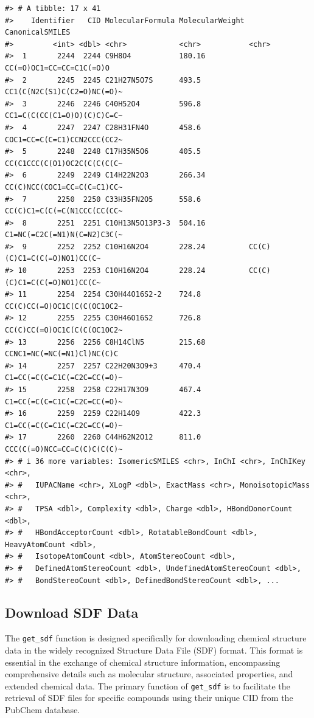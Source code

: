 \begin{verbatim}
#> # A tibble: 17 x 41
#>    Identifier   CID MolecularFormula MolecularWeight CanonicalSMILES            
#>         <int> <dbl> <chr>            <chr>           <chr>                      
#>  1       2244  2244 C9H8O4           180.16          CC(=O)OC1=CC=CC=C1C(=O)O   
#>  2       2245  2245 C21H27N5O7S      493.5           CC1(C(N2C(S1)C(C2=O)NC(=O)~
#>  3       2246  2246 C40H52O4         596.8           CC1=C(C(CC(C1=O)O)(C)C)C=C~
#>  4       2247  2247 C28H31FN4O       458.6           COC1=CC=C(C=C1)CCN2CCC(CC2~
#>  5       2248  2248 C17H35N5O6       405.5           CC(C1CCC(C(O1)OC2C(C(C(C(C~
#>  6       2249  2249 C14H22N2O3       266.34          CC(C)NCC(COC1=CC=C(C=C1)CC~
#>  7       2250  2250 C33H35FN2O5      558.6           CC(C)C1=C(C(=C(N1CCC(CC(CC~
#>  8       2251  2251 C10H13N5O13P3-3  504.16          C1=NC(=C2C(=N1)N(C=N2)C3C(~
#>  9       2252  2252 C10H16N2O4       228.24          CC(C)(C)C1=C(C(=O)NO1)CC(C~
#> 10       2253  2253 C10H16N2O4       228.24          CC(C)(C)C1=C(C(=O)NO1)CC(C~
#> 11       2254  2254 C30H44O16S2-2    724.8           CC(C)CC(=O)OC1C(C(C(OC1OC2~
#> 12       2255  2255 C30H46O16S2      726.8           CC(C)CC(=O)OC1C(C(C(OC1OC2~
#> 13       2256  2256 C8H14ClN5        215.68          CCNC1=NC(=NC(=N1)Cl)NC(C)C 
#> 14       2257  2257 C22H20N3O9+3     470.4           C1=CC(=C(C=C1C(=C2C=CC(=O)~
#> 15       2258  2258 C22H17N3O9       467.4           C1=CC(=C(C=C1C(=C2C=CC(=O)~
#> 16       2259  2259 C22H14O9         422.3           C1=CC(=C(C=C1C(=C2C=CC(=O)~
#> 17       2260  2260 C44H62N2O12      811.0           CCC(C(=O)NCC=CC=C(C)C(C(C)~
#> # i 36 more variables: IsomericSMILES <chr>, InChI <chr>, InChIKey <chr>,
#> #   IUPACName <chr>, XLogP <dbl>, ExactMass <chr>, MonoisotopicMass <chr>,
#> #   TPSA <dbl>, Complexity <dbl>, Charge <dbl>, HBondDonorCount <dbl>,
#> #   HBondAcceptorCount <dbl>, RotatableBondCount <dbl>, HeavyAtomCount <dbl>,
#> #   IsotopeAtomCount <dbl>, AtomStereoCount <dbl>,
#> #   DefinedAtomStereoCount <dbl>, UndefinedAtomStereoCount <dbl>,
#> #   BondStereoCount <dbl>, DefinedBondStereoCount <dbl>, ...
\end{verbatim}

\hypertarget{download-sdf-data}{%
\subsection{Download SDF Data}\label{download-sdf-data}}

The \texttt{get\_sdf} function is designed specifically for downloading chemical structure data in the widely recognized Structure Data File (SDF) format. This format is essential in the exchange of chemical structure information, encompassing comprehensive details such as molecular structure, associated properties, and extended chemical data. The primary function of \texttt{get\_sdf} is to facilitate the retrieval of SDF files for specific compounds using their unique CID from the PubChem database.

